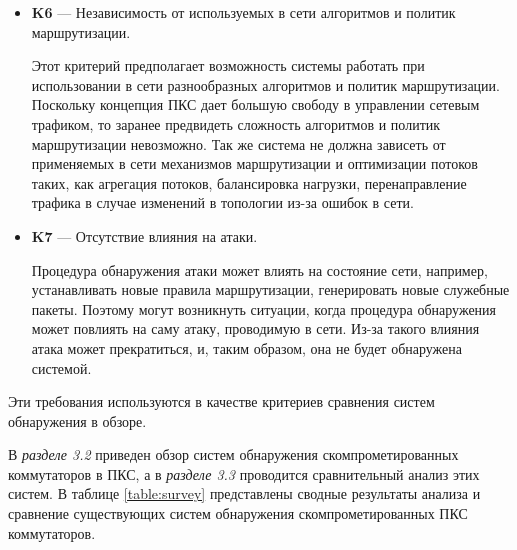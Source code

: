 \documentclass[14pt,autoref,href]{disser}
\theoremstyle{definition}
\begin{document}
\begin{itemize}
\item \textbf{K6} --- Независимость от используемых в сети алгоритмов и политик маршрутизации.

Этот критерий предполагает возможность системы работать при использовании в сети разнообразных алгоритмов и политик маршрутизации.
Поскольку концепция ПКС дает большую свободу в управлении сетевым трафиком, то заранее предвидеть сложность алгоритмов и политик маршрутизации невозможно.
Так же система не должна зависеть от применяемых в сети механизмов маршрутизации и оптимизации потоков таких, как агрегация потоков, балансировка нагрузки, перенаправление трафика в случае изменений в топологии из-за ошибок в сети.

\item \textbf{K7} --- Отсутствие влияния на атаки.

Процедура обнаружения атаки может влиять на состояние сети, например, устанавливать новые правила маршрутизации, генерировать новые служебные пакеты.
Поэтому могут возникнуть ситуации, когда процедура обнаружения может повлиять на саму атаку, проводимую в сети.
Из-за такого влияния атака может прекратиться, и, таким образом, она не будет обнаружена системой.
\end{itemize}
Эти требования используются в качестве критериев сравнения систем обнаружения в обзоре.

В \emph{разделе 3.2} приведен обзор систем обнаружения скомпрометированных коммутаторов в ПКС, а в \emph{разделе 3.3} проводится сравнительный анализ этих систем. В таблице \ref{table:survey} представлены сводные результаты анализа и сравнение существующих систем обнаружения скомпрометированных ПКС коммутаторов.
\end{document}
